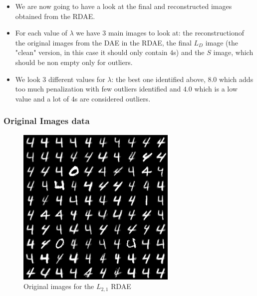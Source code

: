 \documentclass{beamer}
\theoremstyle{plain}
\theoremstyle{definition}
\theoremstyle{remark}
\begin{document}
\begin{frame}
	\begin{itemize}
		\item We are now going to have a look at the final and reconstructed images obtained from the RDAE.
		\item For each value of $\lambda$ we have $3$ main images to look at: the reconstructionof the original images from the DAE in the RDAE, the final $L_D$ image (the "clean" version, in this case it should only contain $4$s) and the $S$ image, which should be non empty only for outliers.
		\item We look $3$ different values for $\lambda$: the best one identified above, $8.0$ which adds too much penalization with few outliers identified and $4.0$ which is a low value and a lot of $4$s are considered outliers.
	\end{itemize}
\end{frame}

\begin{frame}
	\frametitle{Original Images data}
	\begin{figure}
		\centering
		\includegraphics[width=0.5\linewidth]{Images/original_l21.png}
		\caption[]{Original images for the $L_{2,1}$ RDAE}
	\end{figure}
\end{frame}
\end{document}
